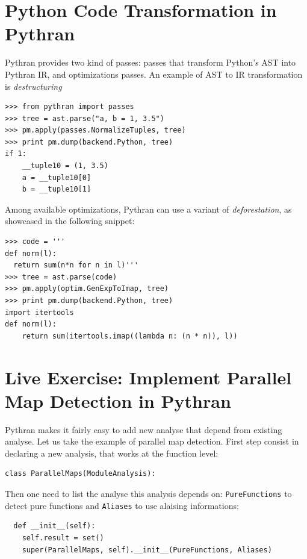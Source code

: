 \documentclass{llncs}
\begin{document}
\section{Python Code Transformation in Pythran}
\label{sec:code-transformation}

Pythran provides two kind of passes: passes that transform Python's \ac{AST}
into Pythran \ac{IR}, and optimizations passes. An example of \ac{AST} to
\ac{IR} transformation is \emph{destructuring}

\begin{lstlisting}
>>> from pythran import passes
>>> tree = ast.parse("a, b = 1, 3.5")
>>> pm.apply(passes.NormalizeTuples, tree)
>>> print pm.dump(backend.Python, tree)
if 1:
    __tuple10 = (1, 3.5)
    a = __tuple10[0]
    b = __tuple10[1]
\end{lstlisting}

Among available optimizations, Pythran can use a variant of \emph{deforestation}, as showcased in the following snippet:
\begin{lstlisting}
>>> code = '''
def norm(l):
  return sum(n*n for n in l)'''
>>> tree = ast.parse(code)
>>> pm.apply(optim.GenExpToImap, tree)
>>> print pm.dump(backend.Python, tree)
import itertools
def norm(l):
    return sum(itertools.imap((lambda n: (n * n)), l))
\end{lstlisting}

\section{Live Exercise: Implement Parallel Map Detection in Pythran}
\label{sec:pmap}

Pythran makes it fairly easy to add new analyse that depend from existing
analyse. Let us take the example of parallel map detection. First step consist
in declaring a new analysis, that works at the function level:

\begin{lstlisting}
class ParallelMaps(ModuleAnalysis):
\end{lstlisting}

Then one need to list the analyse this analysis depends on:
\texttt{PureFunctions} to detect pure functions and \texttt{Aliases} to use
alaising informations:

\begin{lstlisting}
  def __init__(self):
    self.result = set()
    super(ParallelMaps, self).__init__(PureFunctions, Aliases)
\end{lstlisting}
\end{document}
